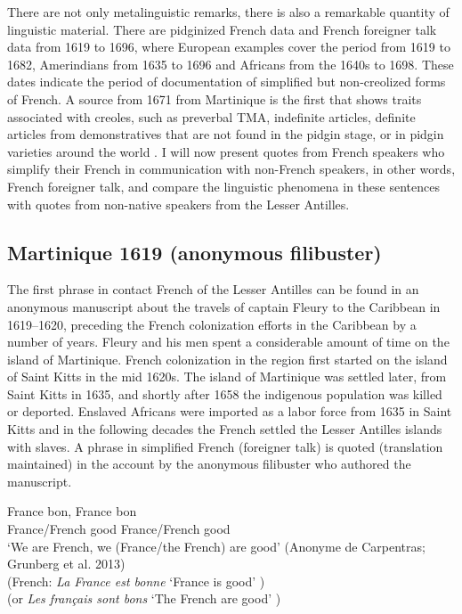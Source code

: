 \documentclass[output=paper,colorlinks,citecolor=brown]{langscibook}
\begin{document}
There are not only metalinguistic remarks, there is also a remarkable quantity of linguistic material. There are pidginized French data and French foreigner talk data from 1619 to 1696, where European examples cover the period from 1619 to 1682, Amerindians from 1635 to 1696 and Africans from the 1640s to 1698. These dates indicate the period of documentation of simplified but non-creolized forms of French. A source from 1671 from Martinique is the first that shows traits associated with creoles, such as preverbal TMA, indefinite articles, definite articles from demonstratives that are not found in the pidgin stage, or in pidgin varieties around the world \citep[11]{Baker1995}.
I will now present quotes from French speakers who simplify their French in communication with non-French speakers, in other words, French foreigner talk, and compare the linguistic phenomena in these sentences with quotes from non-native speakers from the Lesser Antilles.

\subsection{Martinique 1619 (anonymous filibuster)} \label{sec:bakker:3.1}
The first phrase in contact French of the Lesser Antilles can be found in an anonymous manuscript about the travels of captain Fleury to the Caribbean in 1619--1620, preceding the French colonization efforts in the Caribbean by a number of years. Fleury and his men spent a considerable amount of time on the island of Martinique. French colonization in the region first started on the island of Saint Kitts in the mid 1620s. The island of Martinique was settled later, from Saint Kitts in 1635, and shortly after 1658 the indigenous population was killed or deported. Enslaved Africans were imported as a labor force from 1635 in Saint Kitts and in the following decades the French settled the Lesser Antilles islands with slaves.
A phrase in simplified French (foreigner talk) is quoted (translation maintained) in the account by the anonymous filibuster who authored the manuscript.

\ea \label{ex: bakker:1}
\gll France bon, France bon \\
     France/French good France/French good \\
\glt `We are French, we (France/the French) are good'  (Anonyme de Carpentras; Grunberg et al. 2013)\\
    (French: \textit{La France est bonne} `France is good' )\\
    (or \textit{Les français sont bons} `The French are good' )
\z
\end{document}
